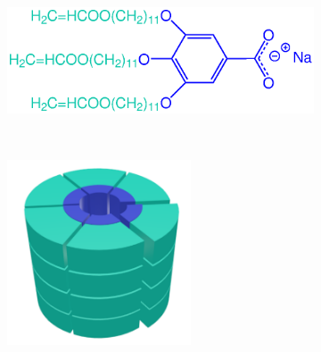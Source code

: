 \documentclass{article}
\begin{document}
  \begin{figure}[!htb]
      \centering
      \begin{subfigure}{.325\textwidth}
              \centering
              \vspace{0.5cm}
              \includegraphics[width=\textwidth]{NaGA3C11_wedge.eps}
              \vspace{0.05cm}
              \caption{}~\label{fig:monomer}
      \end{subfigure}
              \begin{subfigure}{0.325\linewidth}
              \centering
              \includegraphics[width=0.6\textwidth]{columns.pdf}
              \caption{}~\label{fig:wedge_layer}
      \end{subfigure}
      \begin{subfigure}{0.325\linewidth}

\end{subfigure}
\end{figure}
\end{document}
